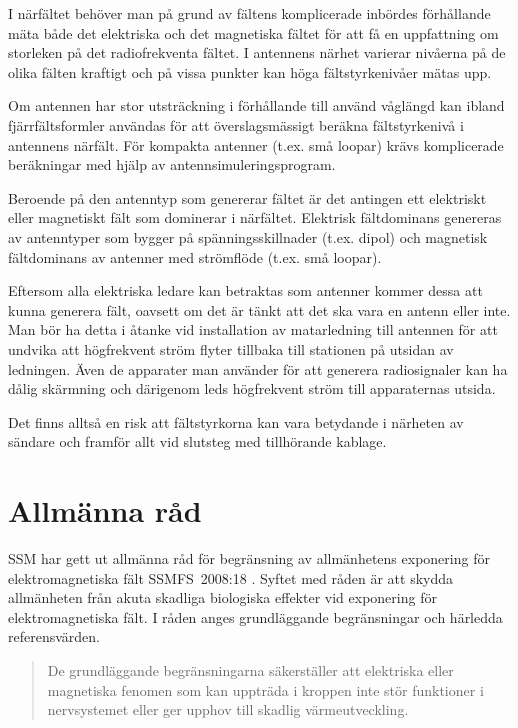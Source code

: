 I närfältet behöver man på grund av fältens komplicerade inbördes förhållande
mäta både det elektriska och det magnetiska fältet för att få en uppfattning
om storleken på det radiofrekventa fältet.
I antennens närhet varierar nivåerna på de olika fälten kraftigt och på vissa
punkter kan höga fältstyrkenivåer mätas upp.

Om antennen har stor utsträckning i förhållande till använd våglängd kan ibland
fjärrfältsformler användas för att överslagsmässigt beräkna fältstyrkenivå i
antennens närfält.
För kompakta antenner (t.ex. små loopar) krävs komplicerade beräkningar
med hjälp av antennsimuleringsprogram.

Beroende på den antenntyp som genererar fältet är det antingen ett elektriskt
eller magnetiskt fält som dominerar i närfältet.
Elektrisk fältdominans genereras av antenntyper som bygger på
spänningsskillnader (t.ex. dipol) och magnetisk fältdominans av antenner
med strömflöde (t.ex. små loopar).

Eftersom alla elektriska ledare kan betraktas som antenner kommer dessa att
kunna generera fält, oavsett om det är tänkt att det ska vara en antenn eller
inte.
Man bör ha detta i åtanke vid installation av matarledning till antennen för
att undvika att högfrekvent ström flyter tillbaka till stationen på utsidan av
ledningen.
Även de apparater man använder för att generera radiosignaler kan ha dålig
skärmning och därigenom leds högfrekvent ström till apparaternas utsida.

Det finns alltså en risk att fältstyrkorna kan vara betydande i närheten av
sändare och framför allt vid slutsteg med tillhörande kablage.

\section{Allmänna råd}

SSM har gett ut allmänna råd för begränsning av allmänhetens exponering
för elektromagnetiska fält SSMFS~2008:18 \cite{SSMFS2008:18}.
Syftet med råden är att skydda allmänheten från akuta
skadliga biologiska effekter vid exponering för elektromagnetiska fält.
I råden anges grundläggande begränsningar och härledda referensvärden.

\begin{quote}
	De grundläggande begränsningarna säkerställer att elektriska eller
	magnetiska fenomen som kan uppträda i kroppen inte stör funktioner i
	nervsystemet eller ger upphov till skadlig värmeutveckling.
\end{quote}

